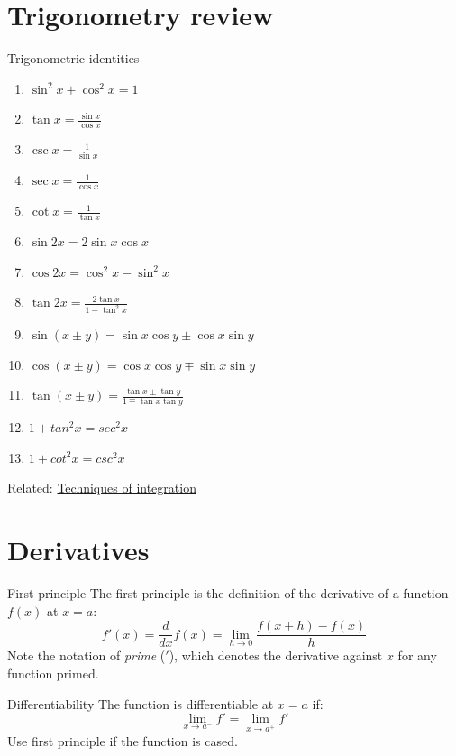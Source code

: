 
\label{sec:trigo}
\section{Trigonometry review}
\begin{theorem}
    {Trigonometric identities}
    \begin{enumerate}
        \item $\sin^2x+\cos^2x=1$
        \item $\tan x=\frac{\sin x}{\cos x}$
        \item $\csc x=\frac{1}{\sin x}$
        \item $\sec x=\frac{1}{\cos x}$
        \item $\cot x=\frac{1}{\tan x}$
        \item $\sin 2x=2\sin x\cos x$
        \item $\cos 2x=\cos^2x-\sin^2x$
        \item $\tan 2x=\frac{2\tan x}{1-\tan^2x}$
        \item $\sin(x\pm y)=\sin x\cos y\pm\cos x\sin y$
        \item $\cos(x\pm y)=\cos x\cos y\mp\sin x\sin y$
        \item $\tan(x\pm y)=\frac{\tan x\pm\tan y}{1\mp\tan x\tan y}$
        \item $1 + tan^2x = sec^2x$
        \item $1 + cot^2x = csc^2x$
    \end{enumerate}
\end{theorem}
Related: \hyperref[sec:integrationtech]{Techniques of integration}

\section{Derivatives}
\begin{definition}
    {First principle}
    The first principle is the definition of the derivative of a function $f(x)$ at $x=a$:
    \[f'(x) = \frac{d}{dx} f(x)=\lim_{h\to 0}\frac{f(x+h)-f(x)}{h}\]
    Note the notation of \textit{prime} ($'$), which denotes the derivative against $x$ for any function primed.
\end{definition}

\begin{theorem}
    {Differentiability}
    The function is differentiable at $x=a$ if:
    \[\lim_{x\to a^-}f'=\lim_{x\to a^+}f'\]
    Use first principle if the function is cased.
\end{theorem}

